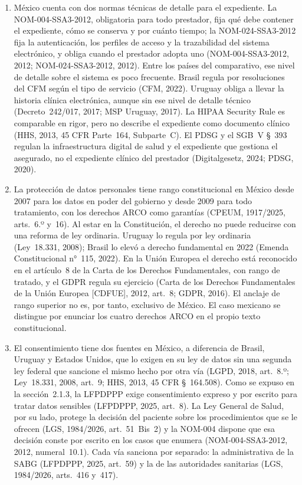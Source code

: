 \documentclass[12pt, a4paper]{article}
\begin{document}
\begin{enumerate}[label=\Roman*.]
 
 \item México cuenta con dos normas técnicas de detalle para el
  expediente. La NOM-004-SSA3-2012, obligatoria para todo prestador,
  fija qué debe contener el expediente, cómo se conserva y por cuánto
  tiempo; la NOM-024-SSA3-2012 fija la autenticación, los perfiles de
  acceso y la trazabilidad del sistema electrónico, y obliga cuando
  el prestador adopta uno (NOM-004-SSA3-2012, 2012;
  NOM-024-SSA3-2012, 2012). Entre los países del comparativo, ese nivel de
  detalle sobre el sistema es poco frecuente. Brasil regula por
  resoluciones del CFM según el tipo de servicio (CFM, 2022). Uruguay
  obliga a llevar la historia clínica electrónica, aunque sin ese nivel de
  detalle técnico (Decreto~242/017, 2017; MSP Uruguay, 2017). La HIPAA
  Security Rule es comparable en rigor,
  pero no describe el expediente como documento clínico (HHS, 2013,
  45 CFR Parte~164, Subparte~C). El PDSG y el SGB~V \S~393 regulan
  la infraestructura digital de salud y el expediente que gestiona el asegurado, no el expediente clínico del prestador (Digitalgesetz,
  2024; PDSG, 2020).
 
  \item La protección de datos personales tiene rango
  constitucional en México desde 2007 para los datos en poder del
  gobierno y desde 2009 para todo tratamiento, con los derechos ARCO
  como garantías (CPEUM, 1917/2025, arts.~6.º y~16). Al estar en la
  Constitución, el derecho no puede reducirse con una reforma de
  ley ordinaria. Uruguay lo regula por ley ordinaria (Ley~18.331,
  2008); Brasil lo elevó a derecho fundamental en 2022 (Emenda
  Constitucional n°~115, 2022). En la Unión Europea el derecho está
  reconocido en el artículo~8 de la Carta de los Derechos
  Fundamentales, con rango de tratado, y el GDPR regula su ejercicio
  (Carta de los Derechos Fundamentales de la Unión Europea [CDFUE],
  2012, art.~8; GDPR, 2016). El anclaje de rango superior no es, por
  tanto, exclusivo de México. El caso mexicano se distingue por
  enunciar los cuatro derechos ARCO en el propio texto
  constitucional.
 
  \item El consentimiento tiene dos fuentes en México, a diferencia
  de Brasil, Uruguay y Estados Unidos, que lo exigen en su ley de
  datos sin una segunda ley federal que sancione el mismo hecho por
  otra vía (LGPD, 2018, art.~8.º; Ley~18.331, 2008, art.~9; HHS,
  2013, 45 CFR \S~164.508). Como se expuso en la sección~2.1.3, la
  LFPDPPP exige consentimiento expreso y por escrito para tratar
  datos sensibles (LFPDPPP, 2025, art.~8). La Ley General de Salud,
  por su lado, protege la decisión del paciente sobre los
  procedimientos que se le ofrecen (LGS, 1984/2026, art.~51~Bis~2)
  y la NOM-004 dispone que esa decisión conste por escrito en los
  casos que enumera (NOM-004-SSA3-2012, 2012, numeral~10.1). Cada
  vía sanciona por separado: la administrativa de la SABG (LFPDPPP,
  2025, art.~59) y la de las autoridades sanitarias (LGS, 1984/2026,
  arts.~416 y~417).
 

\end{enumerate}
\end{document}
